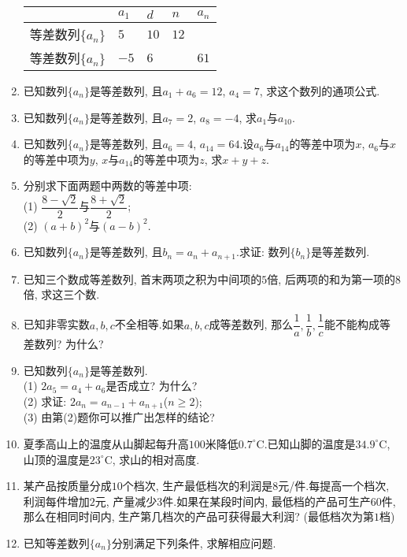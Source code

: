\documentclass[10pt,a4paper]{article}
\begin{document}
\begin{enumerate}[1.]
\begin{center}
    \begin{tabular}{|p{}<{\centering}|p{}<{\centering}|p{}<{\centering}|p{}<{\centering}|p{}<{\centering}|}
        \hline
         & $a_1$ & $d$ & $n$ & $a_n$ \\ \hline
        等差数列$\{a_n\}$ & $5$ & $10$ & $12$ &  \\ \hline
        等差数列$\{a_n\}$ & $-5$ & $6$ & & $61$ \\ \hline
    \end{tabular}
\end{center}
\item 已知数列$\{a_n\}$是等差数列, 且$a_1+a_6=12$, $a_4=7$, 求这个数列的通项公式.
\item 已知数列$\{a_n\}$是等差数列, 且$a_7=2$, $a_8=-4$, 求$a_1$与$a_{10}$.
\item 已知数列$\{a_n\}$是等差数列, 且$a_6=4$, $a_{14}=64$.设$a_6$与$a_{14}$的等差中项为$x$, $a_6$与$x$的等差中项为$y$, $x$与$a_{14}$的等差中项为$z$, 求$x+y+z$.
\item 分别求下面两题中两数的等差中项:\\
(1) $\dfrac{8-\sqrt 2}2$与$\dfrac{8+\sqrt 2}2$;\\
(2) $(a+b)^2$与$(a-b)^2$.
\item 已知数列$\{a_n\}$是等差数列, 且$b_n=a_n+a_{n+1}$.求证: 数列$\{b_n\}$是等差数列.
\item 已知三个数成等差数列, 首末两项之积为中间项的$5$倍, 后两项的和为第一项的$8$倍, 求这三个数.
\item 已知非零实数$a,b,c$不全相等.如果$a,b,c$成等差数列, 那么$\dfrac 1a,\dfrac 1b,\dfrac 1c$能不能构成等差数列? 为什么?
\item 已知数列$\{a_n\}$是等差数列.\\
(1) $2a_5=a_4+a_6$是否成立? 为什么?\\
(2) 求证: $2a_n=a_{n-1}+a_{n+1}$($n\ge 2$);\\
(3) 由第(2)题你可以推广出怎样的结论?
\item 夏季高山上的温度从山脚起每升高$100$米降低$0.7^\circ\text{C}$.已知山脚的温度是$34.9^\circ\text{C}$, 山顶的温度是$23^\circ\text{C}$, 求山的相对高度.
\item 某产品按质量分成$10$个档次, 生产最低档次的利润是$8$元/件.每提高一个档次, 利润每件增加$2$元, 产量减少$3$件.如果在某段时间内, 最低档的产品可生产$60$件, 那么在相同时间内, 生产第几档次的产品可获得最大利润? (最低档次为第$1$档)
\item 已知等差数列$\{a_n\}$分别满足下列条件, 求解相应问题.\\

\end{enumerate}
\end{document}
